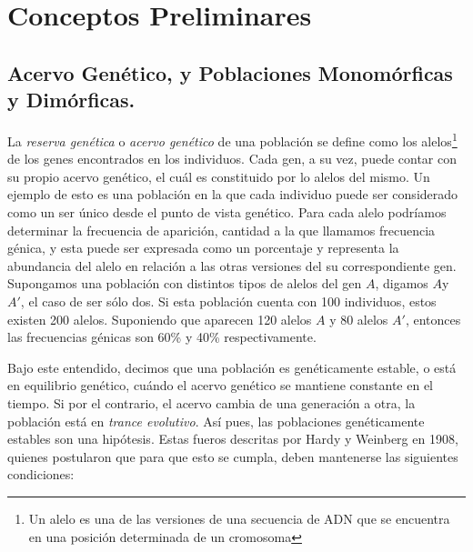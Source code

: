 \section{Conceptos Preliminares}
\subsection{Acervo Genético, y Poblaciones Monomórficas y Dimórficas.}

La \textit{reserva genética} o \textit{acervo genético} de una población se define como los alelos\footnote{Un alelo es una de las versiones de una secuencia de ADN que se encuentra en una posición determinada de un cromosoma} de los genes encontrados en los individuos. Cada gen, a su vez, puede contar con su propio acervo genético, el cuál es constituido por lo alelos del mismo. Un ejemplo de esto es una población en la que cada individuo puede ser considerado como un ser único desde el punto de vista genético. Para cada alelo podríamos determinar la frecuencia de aparición, cantidad a la que llamamos frecuencia génica, y esta puede ser expresada como un porcentaje y representa la abundancia del alelo en relación a las otras versiones del su correspondiente gen. Supongamos una población con distintos tipos de alelos del gen $A$, digamos $A$y $A'$, el caso de ser sólo dos. Si esta población cuenta con 100 individuos, estos existen 200 alelos. Suponiendo que aparecen 120 alelos $A$ y 80 alelos $A'$, entonces las frecuencias génicas son 60\% y 40\% respectivamente.

Bajo este entendido, decimos que una población es genéticamente estable, o está en equilibrio genético, cuándo el acervo genético se mantiene constante en el tiempo. Si por el contrario, el acervo cambia de una generación a otra, la población está en \textit{trance evolutivo}. Así pues, las poblaciones genéticamente estables son una hipótesis. Estas fueros descritas por Hardy y Weinberg en 1908, quienes postularon que para que esto se cumpla, deben mantenerse las siguientes condiciones:

